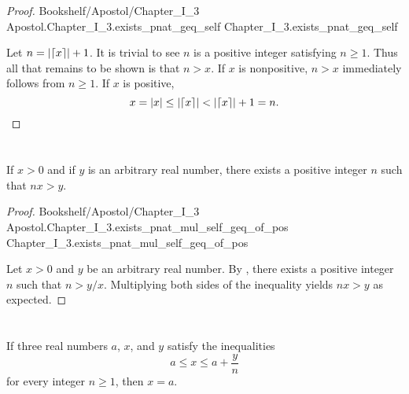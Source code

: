\documentclass{article}
\newcommand{\link}[1]{\lean{../..}
  {Bookshelf/Apostol/Chapter\_I\_3}
  {Apostol.Chapter\_I\_3.#1}
  {Chapter\_I\_3.#1}
}
\begin{document}
\begin{proof}

  \link{exists\_pnat\_geq\_self}

  \divider

  Let $n = \left|\left\lceil x\right\rceil\right| + 1$.
  It is trivial to see $n$ is a positive integer satisfying $n \geq 1$.
  Thus all that remains to be shown is that $n > x$.
  If $x$ is nonpositive, $n > x$ immediately follows from $n \geq 1$.
  If $x$ is positive,
    $$x = \left|x\right| \leq \left|\left\lceil x\right\rceil\right| < \left|\left\lceil x\right\rceil\right| + 1 = n.$$

\end{proof}

\section*{}%
%

If $x > 0$ and if $y$ is an arbitrary real number, there exists a positive
  integer $n$ such that $nx > y$.


\begin{proof}

  \link{exists\_pnat\_mul\_self\_geq\_of\_pos}

  \divider

  Let $x > 0$ and $y$ be an arbitrary real number.
  By , there exists a positive integer $n$ such that
    $n > y / x$.
  Multiplying both sides of the inequality yields $nx > y$ as expected.

\end{proof}

\section*{}%
%

If three real numbers $a$, $x$, and $y$ satisfy the inequalities
  $$a \leq x \leq a + \frac{y}{n}$$ for every integer $n \geq 1$, then $x = a$.
\end{document}
